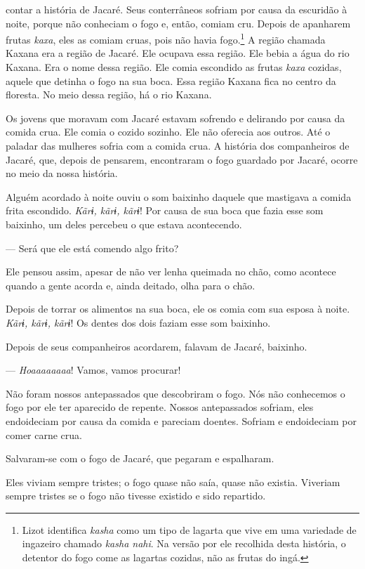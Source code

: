  contar a história de Jacaré. Seus conterrâneos sofriam por causa
da escuridão à noite, porque não conheciam o fogo e, então, comiam cru.
Depois de apanharem frutas \textit{kaxa}, eles as comiam cruas, pois não
havia fogo.\footnote{Lizot identifica \textit{kasha} como um tipo de lagarta que vive em uma variedade de ingazeiro chamado \textit{kasha nahi}. Na versão por ele recolhida desta história, o detentor do fogo come as lagartas cozidas, não as frutas do ingá.} A região chamada Kaxana era a região de Jacaré. Ele ocupava
essa região. Ele bebia a água do rio Kaxana. Era o nome dessa região.
Ele comia escondido as frutas \textit{kaxa} cozidas, aquele que
detinha o fogo na sua boca. Essa região Kaxana fica no centro da
floresta. No meio dessa região, há o rio Kaxana. 

Os jovens que moravam com Jacaré estavam sofrendo e delirando por causa
da comida crua. Ele comia o cozido sozinho. Ele não oferecia aos outros. Até o
paladar das mulheres sofria com a comida crua. A história dos
companheiros de Jacaré, que, depois de pensarem, encontraram o fogo
guardado por Jacaré, ocorre no meio da nossa história. 

Alguém acordado à noite ouviu o som baixinho daquele que mastigava
a comida frita escondido. \textit{Kãrɨ, kãrɨ, kãrɨ}! Por causa de sua boca
que fazia esse som baixinho, um deles percebeu o que estava acontecendo. 

--- Será que ele está comendo algo frito?

Ele pensou assim, apesar de não ver lenha queimada no chão, como
acontece quando a gente acorda e, ainda deitado, olha para o chão. 

Depois de torrar os alimentos na sua boca, ele os comia com sua esposa à
noite. \textit{Kãrɨ, kãrɨ, kãrɨ}! Os dentes dos dois faziam esse som
baixinho. 

Depois de seus companheiros acordarem, falavam de Jacaré, baixinho. 

--- \textit{Hoaaaaaaaa}! Vamos, vamos procurar! 

Não foram nossos antepassados que descobriram o fogo. Nós não conhecemos
o fogo por ele ter aparecido de repente. Nossos antepassados sofriam,
eles endoideciam por causa da comida e pareciam doentes. Sofriam e
endoideciam por comer carne crua. 

Salvaram-se com o fogo de Jacaré, que pegaram e espalharam. 

Eles viviam sempre tristes; o fogo quase não saía, quase não existia.
Viveriam sempre tristes se o fogo não tivesse existido e sido
repartido. 

